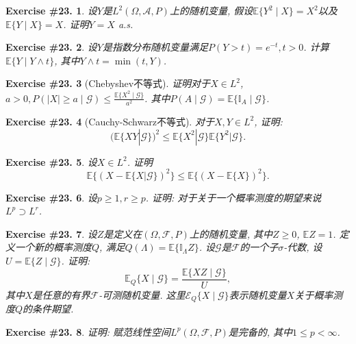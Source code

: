 \documentclass[UTF8, a4paper]{article}
\newtheorem{exercise}{Exercise \#23.}
\begin{document}
\begin{exercise}
设\(Y\)是\(L^2(\Omega, \mathcal{A}, P)\)上的随机变量, 假设\(\mathbb{E}\{Y^2 \mid X\} = X^2\)以及\(\mathbb{E}\{Y \mid X\} = X\).
证明\(Y = X\) a.s.
\end{exercise}

\begin{exercise}
设\(Y\)是指数分布随机变量满足\(P(Y > t) = e^{-t}, t >0\).
计算\(\mathbb{E}\{Y \mid Y \wedge t\}\), 其中\(Y \wedge t = \min(t,Y)\).
\end{exercise}


\begin{exercise}[Chebyshev不等式]
证明对于\(X \in L^2\), \(a > 0, P(|X| \geq a \mid \mathcal{G}) \leq \frac{\mathbb{E}\{X^2 \mid \mathcal{G}\}}{a^2}\).
其中\(P(A\mid \mathcal{G}) = \mathbb{E}\{\mathbb{I}_A \mid \mathcal{G}\}\).
\end{exercise}


\begin{exercise}[Cauchy-Schwarz不等式]
对于\(X,Y \in L^2\), 证明: 
$$(\mathbb{E}\{XY|\mathcal{G}\})^2\leq \mathbb{E}\{X^2|\mathcal{G}\}\mathbb{E}\{Y^2|\mathcal{G}\}.$$
\end{exercise}


\begin{exercise}
    设\(X \in L^2\). 证明 $$\mathbb{E}\{(X-\mathbb{E}\{X|\mathcal{G}\})^2\}\leq \mathbb{E}\{(X-\mathbb{E}\{X\})^2\}.$$
\end{exercise}




\begin{exercise}
设\(p \geq 1, r \geq p\).
证明: 对于关于一个概率测度的期望来说\(L^p \supset L^r\). 
\end{exercise}



\begin{exercise}
设\(Z\)是定义在\((\Omega, \mathcal{F}, P)\)上的随机变量, 其中\(Z \geq 0\), \(\mathbb{E}Z = 1\).
定义一个新的概率测度\(Q\), 满足\(Q(\Lambda) = \mathbb{E}\{\mathbb{I}_{\Lambda} Z\}\).
设\(\mathcal{G}\)是\(\mathcal{F}\)的一个子\(\sigma\)-代数, 设\(U = \mathbb{E}\{Z\mid \mathcal{G}\}\).
证明: 
$$
\mathbb{E}_Q\{X \mid \mathcal{G}\} = \frac{\mathbb{E}\{XZ\mid \mathcal{G}\}}{U}, 
$$
其中\(X\)是任意的有界\(\mathcal{F}\)-可测随机变量.
这里\(\mathcal{E}_Q\{X\mid \mathcal{G}\}\)表示随机变量\(X\)关于概率测度\(Q\)的条件期望.
\end{exercise}




\begin{exercise}
证明: 赋范线性空间\(L^p(\Omega, \mathcal{F}, P)\)是完备的, 其中\(1\leq p < \infty\).
\end{exercise}
\end{document}
